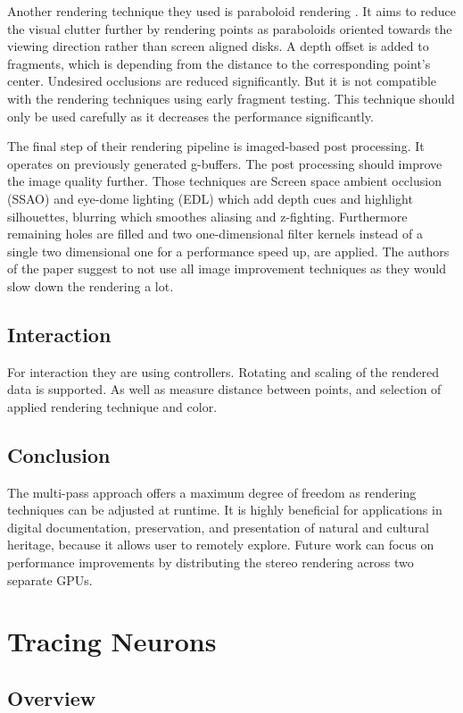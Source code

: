 \documentclass[10pt,twocolumn,letterpaper]{article}
\begin{document}
Another rendering technique they used is paraboloid rendering \cite{schutz2016potree}. It aims to reduce the visual clutter further by rendering points as paraboloids oriented towards the viewing direction rather than screen aligned disks. A depth offset is added to fragments, which is depending from the distance to the corresponding point's center. Undesired occlusions are reduced significantly. But it is not compatible with the rendering techniques using early fragment testing. This technique should only be used carefully as it decreases the performance significantly.

\setlength{\parindent}{1pc}The final step of their rendering pipeline is imaged-based post processing. It operates on previously generated g-buffers. The post processing should improve the image quality further. Those techniques are Screen space ambient occlusion (SSAO) \cite{mittring2007finding} and eye-dome lighting (EDL) \cite{boucheny2009interactive} which add depth cues and highlight silhouettes, blurring \cite{lukin2016tips} which smoothes aliasing and z-fighting. Furthermore remaining holes are filled and two one-dimensional filter kernels \cite{dobrev2010image} instead of a single two dimensional one for a performance speed up, are applied.
The authors of the paper suggest to not use all image improvement techniques as they would slow down the rendering a lot.


\subsection{Interaction}
For interaction they are using controllers. Rotating and scaling of the rendered data is supported. As well as measure distance between points, and selection of applied rendering technique and color.
\subsection{Conclusion}
The multi-pass approach offers a maximum degree of freedom as rendering techniques can be adjusted at runtime. It is highly beneficial for applications in digital documentation, preservation, and presentation of natural and cultural heritage, because it allows user to remotely explore. Future work can focus on performance improvements by distributing the stereo rendering across two separate GPUs.
\section{Tracing Neurons}
\subsection{Overview}
\end{document}
